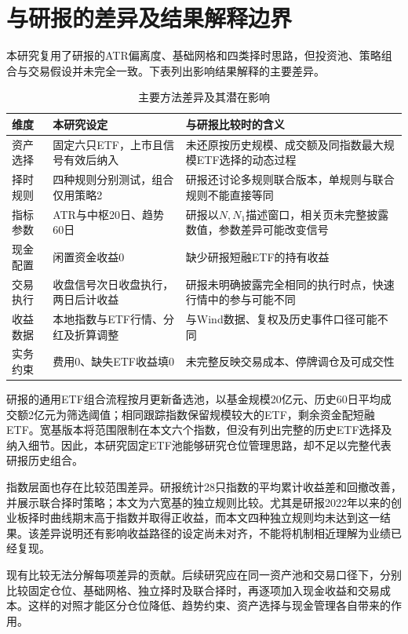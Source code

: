 \documentclass[UTF8,a4paper,11pt,fontset=fandol]{ctexart}
\begin{document}
\section{与研报的差异及结果解释边界}
本研究复用了研报的ATR偏离度、基础网格和四类择时思路，但投资池、策略组合与交易假设并未完全一致。下表列出影响结果解释的主要差异。
\begin{table}[htbp]\centering\small
\caption{主要方法差异及其潜在影响}
\begin{tabularx}{\linewidth}{l Y Y}\toprule
维度 & 本研究设定 & 与研报比较时的含义\\\midrule
资产选择 & 固定六只ETF，上市且信号有效后纳入 & 未还原按历史规模、成交额及同指数最大规模ETF选择的动态过程\\
择时规则 & 四种规则分别测试，组合仅用策略2 & 研报还讨论多规则联合版本，单规则与联合规则不能直接等同\\
指标参数 & ATR与中枢20日、趋势60日 & 研报以$N,N_1$描述窗口，相关页未完整披露数值，参数差异可能改变信号\\
现金配置 & 闲置资金收益0 & 缺少研报短融ETF的持有收益\\
交易执行 & 收盘信号次日收盘执行，两日后计收益 & 研报未明确披露完全相同的执行时点，快速行情中的参与可能不同\\
收益数据 & 本地指数与ETF行情、分红及折算调整 & 与Wind数据、复权及历史事件口径可能不同\\
实务约束 & 费用0、缺失ETF收益填0 & 未完整反映交易成本、停牌调仓及可成交性\\\bottomrule
\end{tabularx}
\end{table}

研报的通用ETF组合流程按月更新备选池，以基金规模20亿元、历史60日平均成交额2亿元为筛选阈值；相同跟踪指数保留规模较大的ETF，剩余资金配短融ETF。宽基版本将范围限制在本文六个指数，但没有列出完整的历史ETF选择及纳入细节。因此，本研究固定ETF池能够研究仓位管理思路，却不足以完整代表研报历史组合。

指数层面也存在比较范围差异。研报统计28只指数的平均累计收益差和回撤改善，并展示联合择时策略；本文为六宽基的独立规则比较。尤其是研报2022年以来的创业板择时曲线期末高于指数并取得正收益，而本文四种独立规则均未达到这一结果。该差异说明还有影响收益路径的设定尚未对齐，不能将机制相近理解为业绩已经复现。

现有比较无法分解每项差异的贡献。后续研究应在同一资产池和交易口径下，分别比较固定仓位、基础网格、独立择时及联合择时，再逐项加入现金收益和交易成本。这样的对照才能区分仓位降低、趋势约束、资产选择与现金管理各自带来的作用。
\end{document}
